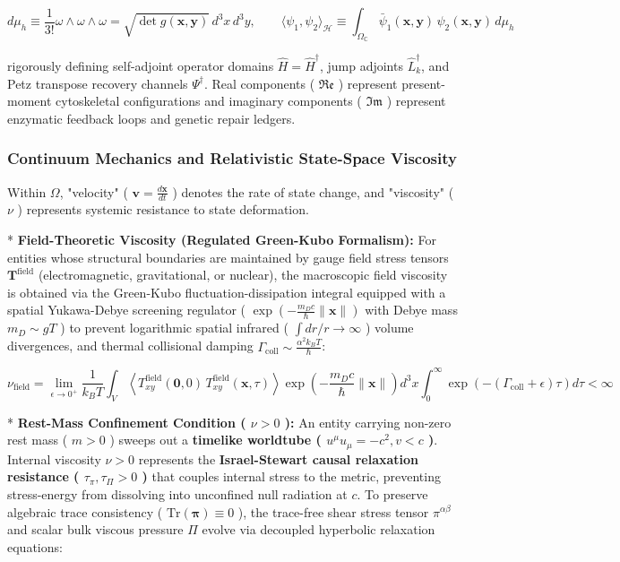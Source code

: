 \documentclass[11pt,a4paper]{article}
\theoremstyle{definition}
\theoremstyle{remark}
\begin{document}
\begin{equation}
\boxed{d\mu_h \equiv \frac{1}{3!} \omega \wedge \omega \wedge \omega = \sqrt{\det g(\mathbf{x}, \mathbf{y})} \, d^3x \, d^3y, \qquad \langle \psi_1, \psi_2 \rangle_{\mathcal{H}} \equiv \int_{\Omega_{\mathbb{C}}} \bar{\psi}_1(\mathbf{x}, \mathbf{y}) \, \psi_2(\mathbf{x}, \mathbf{y}) \, d\mu_h}
\end{equation}


rigorously defining self-adjoint operator domains $\hat{H} = \hat{H}^\dagger$, jump adjoints $\hat{L}_k^\dagger$, and Petz transpose recovery channels $\Psi^\dagger$. Real components ( $\mathfrak{Re}$ ) represent present-moment cytoskeletal configurations and imaginary components ( $\mathfrak{Im}$ ) represent enzymatic feedback loops and genetic repair ledgers.

\subsubsection{Continuum Mechanics and Relativistic State-Space Viscosity}
Within $\Omega$, "velocity" ( $\mathbf{v} = \frac{d\mathbf{x}}{dt}$ ) denotes the rate of state change, and "viscosity" ( $\nu$ ) represents systemic resistance to state deformation.

* \textbf{Field-Theoretic Viscosity (Regulated Green-Kubo Formalism):} For entities whose structural boundaries are maintained by gauge field stress tensors $\mathbf{T}^{\text{field}}$ (electromagnetic, gravitational, or nuclear), the macroscopic field viscosity is obtained via the Green-Kubo fluctuation-dissipation integral equipped with a spatial Yukawa-Debye screening regulator ( $\exp(-\frac{m_D c}{\hbar}\|\mathbf{x}\|)$ with Debye mass $m_D \sim g T$ ) to prevent logarithmic spatial infrared ( $\int dr/r \to \infty$ ) volume divergences, and thermal collisional damping $\Gamma_{\text{coll}} \sim \frac{\alpha^2 k_B T}{\hbar}$:


\begin{equation}
\nu_{\text{field}} = \lim_{\epsilon \to 0^+} \frac{1}{k_B T} \int_V \left\langle T_{xy}^{\text{field}}(\mathbf{0}, 0) \, T_{xy}^{\text{field}}(\mathbf{x}, \tau) \right\rangle \exp\left( -\frac{m_D c}{\hbar}\|\mathbf{x}\| \right) d^3x \int_0^\infty \exp\left( -\left(\Gamma_{\text{coll}} + \epsilon\right)\tau \right) d\tau < \infty
\end{equation}


* \textbf{Rest-Mass Confinement Condition ( $\nu > 0$ ):} An entity carrying non-zero rest mass ( $m > 0$ ) sweeps out a \textbf{timelike worldtube ( $u^\mu u_\mu = -c^2, v < c$ )}. Internal viscosity $\nu > 0$ represents the \textbf{Israel-Stewart causal relaxation resistance ( $\tau_\pi, \tau_\Pi > 0$ )} that couples internal stress to the metric, preventing stress-energy from dissolving into unconfined null radiation at $c$. To preserve algebraic trace consistency ( $\mathrm{Tr}(\boldsymbol{\pi}) \equiv 0$ ), the trace-free shear stress tensor $\pi^{\alpha\beta}$ and scalar bulk viscous pressure $\Pi$ evolve via decoupled hyperbolic relaxation equations:
\end{document}
